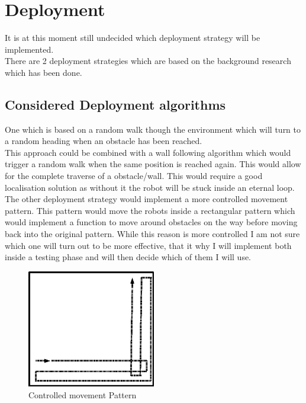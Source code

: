 \section{Deployment}
It is at this moment still undecided which deployment strategy will be implemented. \\
There are 2 deployment strategies which are based on the background research which has been done.\\[3ex]

\subsection{Considered Deployment algorithms}

One which is based on a random walk though the environment which will turn to a random heading when an obstacle has been reached. \\
This approach could be combined with a wall following algorithm which would trigger a random walk when the same position is reached again. This would allow for the complete traverse of a obstacle/wall. This would require a good localisation solution as without it the robot will be stuck inside an eternal loop.\\[3ex]

The other deployment strategy would implement a more controlled movement pattern. This pattern would move the robots inside a rectangular pattern which would implement a function to move around obstacles on the way before moving back into the original pattern. 
While this reason is more controlled I am not sure which one will turn out to be more effective, that it why I will implement both inside a testing phase and will then decide which of them I will use.

\begin{figure}[h]
\centering
\includegraphics[width=0.5\textwidth]{../../figures/movement_pattern.png} 
\caption{Controlled movement Pattern}
\label{Figure 3}
\end{figure}

